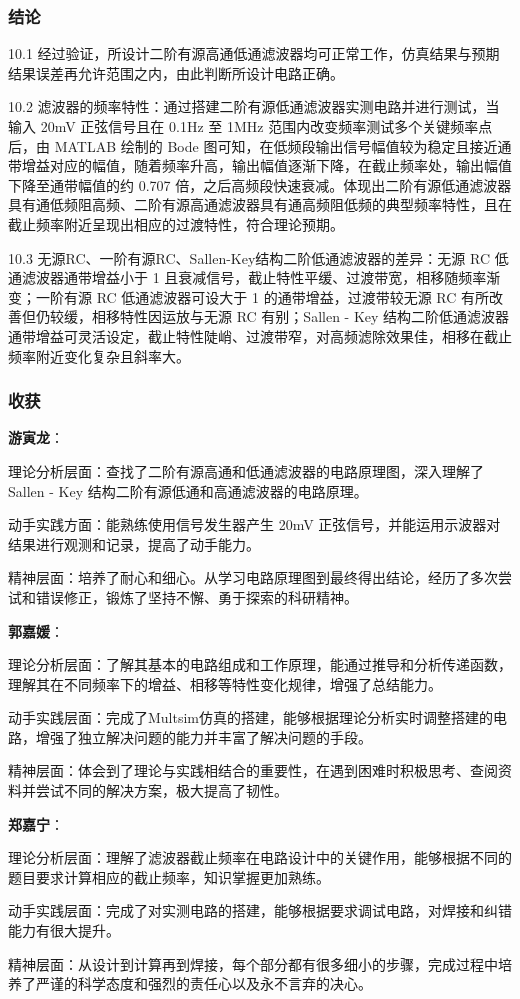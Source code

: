 \documentclass[./测控三级项目.tex]{subfiles} %
\begin{document}
		\subsubsection{结论}
		10.1 经过验证，所设计二阶有源高通低通滤波器均可正常工作，仿真结果与预期结果误差再允许范围之内，由此判断所设计电路正确。\par
		10.2 滤波器的频率特性：通过搭建二阶有源低通滤波器实测电路并进行测试，当输入 20mV 正弦信号且在 0.1Hz 至 1MHz 范围内改变频率测试多个关键频率点后，由 MATLAB 绘制的 Bode 图可知，在低频段输出信号幅值较为稳定且接近通带增益对应的幅值，随着频率升高，输出幅值逐渐下降，在截止频率处，输出幅值下降至通带幅值的约 0.707 倍，之后高频段快速衰减。体现出二阶有源低通滤波器具有通低频阻高频、二阶有源高通滤波器具有通高频阻低频的典型频率特性，且在截止频率附近呈现出相应的过渡特性，符合理论预期。\par
		10.3 无源RC、一阶有源RC、Sallen-Key结构二阶低通滤波器的差异：无源 RC 低通滤波器通带增益小于 1 且衰减信号，截止特性平缓、过渡带宽，相移随频率渐变；一阶有源 RC 低通滤波器可设大于 1 的通带增益，过渡带较无源 RC 有所改善但仍较缓，相移特性因运放与无源 RC 有别；Sallen - Key 结构二阶低通滤波器通带增益可灵活设定，截止特性陡峭、过渡带窄，对高频滤除效果佳，相移在截止频率附近变化复杂且斜率大。\par
		\subsubsection{收获}
		\textbf{游寅龙}：\par
		理论分析层面：查找了二阶有源高通和低通滤波器的电路原理图，深入理解了 Sallen - Key 结构二阶有源低通和高通滤波器的电路原理。\par
		动手实践方面：能熟练使用信号发生器产生 20mV 正弦信号，并能运用示波器对结果进行观测和记录，提高了动手能力。\par
		精神层面：培养了耐心和细心。从学习电路原理图到最终得出结论，经历了多次尝试和错误修正，锻炼了坚持不懈、勇于探索的科研精神。\par
		\textbf{郭嘉媛}：\par
		理论分析层面：了解其基本的电路组成和工作原理，能通过推导和分析传递函数，理解其在不同频率下的增益、相移等特性变化规律，增强了总结能力。\par
		动手实践层面：完成了Multsim仿真的搭建，能够根据理论分析实时调整搭建的电路，增强了独立解决问题的能力并丰富了解决问题的手段。\par
		精神层面：体会到了理论与实践相结合的重要性，在遇到困难时积极思考、查阅资料并尝试不同的解决方案，极大提高了韧性。\par
		\textbf{郑嘉宁}：\par
		理论分析层面：理解了滤波器截止频率在电路设计中的关键作用，能够根据不同的题目要求计算相应的截止频率，知识掌握更加熟练。\par
		动手实践层面：完成了对实测电路的搭建，能够根据要求调试电路，对焊接和纠错能力有很大提升。\par
		精神层面：从设计到计算再到焊接，每个部分都有很多细小的步骤，完成过程中培养了严谨的科学态度和强烈的责任心以及永不言弃的决心。
	
	
	
\end{document}
